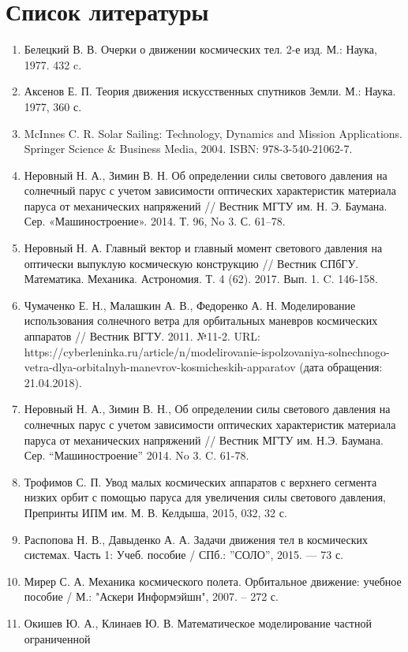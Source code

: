 \chapter{Список литературы}
\begin{enumerate}
  \item Белецкий В. В. Очерки о движении космических тел. 2-е изд. М.: Наука, 1977. 432 c.
  \item Аксенов Е. П. Теория движения искусственных спутников Земли. М.: Наука. 1977, 360 с.
  \item McInnes C. R. Solar Sailing: Technology, Dynamics and Mission Applications. Springer Science \&
Business Media, 2004. ISBN: 978-3-540-21062-7.
  \item Неровный Н. А., Зимин В. Н. Об определении силы светового давления на солнечный парус
с учетом зависимости оптических характеристик материала паруса от механических напряжений //
Вестник МГТУ им. Н. Э. Баумана. Сер. «Машиностроение». 2014. Т. 96, No 3. С. 61–78.
  \item Неровный Н. А. Главный вектор и главный момент светового давления на оптически выпуклую космическую конструкцию //
Вестник СПбГУ. Математика. Механика. Астрономия. Т. 4 (62). 2017. Вып. 1. C. 146-158.
  \item Чумаченко Е. Н., Малашкин А. В., Федоренко А. Н. Моделирование использования солнечного ветра
для орбитальных маневров космических аппаратов // Вестник ВГТУ. 2011. №11-2.
URL: https://cyberleninka.ru/article/n/modelirovanie-ispolzovaniya-solnechnogo-vetra-dlya-orbitalnyh-manevrov-kosmicheskih-apparatov (дата обращения: 21.04.2018).
  \item Неровный Н. А., Зимин В. Н., Об определении силы светового давления на солнечных парус
с учетом зависимости оптических характеристик материала паруса от механических напряжений //
Вестник МГТУ им. Н.Э. Баумана. Сер. “Машиностроение” 2014. No 3. C. 61-78.
  \item Трофимов С. П. Увод малых космических аппаратов с верхнего сегмента низких орбит
с помощью паруса для увеличения силы светового давления, Препринты ИПМ им. М. В. Келдыша, 2015, 032, 32 с.
  \item Распопова Н. В., Давыденко А. А. Задачи движения тел в космических системах.
Часть 1: Учеб. пособие / СПб.: ”СОЛО”, 2015. — 73 с.
  \item Мирер С. А. Механика космического полета. Орбитальное движение: учебное пособие /
М.: "Аскери Информэйшн", 2007. -- 272 с.
  \item Окишев Ю. А., Клинаев Ю. В. Математическое моделирование частной ограниченной

\end{enumerate}
